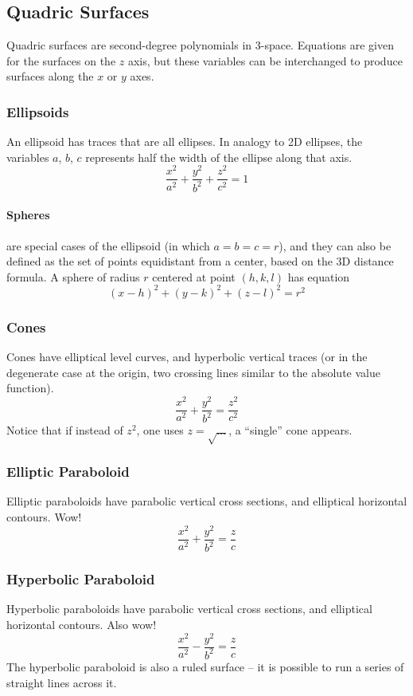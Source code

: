 \documentclass{article}
\begin{document}
\subsection{Quadric Surfaces}
Quadric surfaces are second-degree polynomials in 3-space. Equations are given for the surfaces on the $z$ axis, but these variables can be interchanged to produce surfaces along the $x$ or $y$ axes.

\subsubsection{Ellipsoids}
An ellipsoid has traces that are all ellipses. In analogy to 2D ellipses, the variables $a$, $b$, $c$ represents half the width of the ellipse along that axis.
$$\frac{x^2}{a^2} + \frac{y^2}{b^2}+\frac{z^2}{c^2}=1$$

\paragraph{Spheres} are special cases of the ellipsoid (in which $a=b=c=r$), and they can also be defined as the set of points equidistant from a center, based on the 3D distance formula. A sphere of radius $r$ centered at point $(h, k, l)$ has equation
$$(x-h)^2+(y-k)^2+(z-l)^2=r^2$$

\subsubsection{Cones}
Cones have elliptical level curves, and hyperbolic vertical traces (or in the degenerate case at the origin, two crossing lines similar to the absolute value function).
$$\frac{x^2}{a^2} + \frac{y^2}{b^2} = \frac{z^2}{c^2}$$
Notice that if instead of $z^2$, one uses $z=\sqrt{\ldots}$, a ``single'' cone appears.

\subsubsection{Elliptic Paraboloid}
Elliptic paraboloids have parabolic vertical cross sections, and elliptical horizontal contours. Wow!
$$\frac{x^2}{a^2} + \frac{y^2}{b^2} = \frac{z}{c}$$

\subsubsection{Hyperbolic Paraboloid}
Hyperbolic paraboloids have parabolic vertical cross sections, and elliptical horizontal contours. Also wow!
$$\frac{x^2}{a^2} - \frac{y^2}{b^2} = \frac{z}{c}$$
The hyperbolic paraboloid is also a ruled surface -- it is possible to run a series of straight lines across it.
\end{document}
